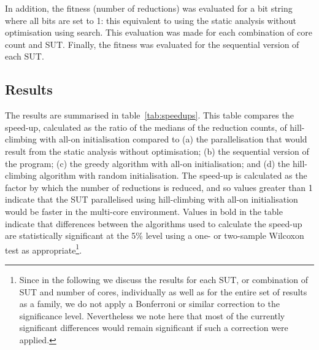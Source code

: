 In addition, the fitness (number of reductions) was evaluated for a bit string where all bits are set to 1: this equivalent to using the static analysis without optimisation using search.  This evaluation was made for each combination of core count and SUT.  Finally, the fitness was evaluated for the sequential version of each SUT.

\subsection{Results}

The results are summarised in table~\ref{tab:speedups}.  This table compares the speed-up, calculated as the ratio of the medians of the reduction counts, of hill-climbing with all-on initialisation compared to (a) the parallelisation that would result from the static analysis without optimisation; (b) the sequential version of the program; (c) the greedy algorithm with all-on initialisation; and (d) the hill-climbing algorithm with random initialisation.  The speed-up is calculated as the factor by which the number of reductions is reduced, and so values greater than 1 indicate that the SUT parallelised using hill-climbing with all-on initialisation would be faster in the multi-core environment.  Values in bold in the table indicate that differences between the algorithms used to calculate the speed-up are statistically significant at the 5\% level using a one- or two-sample Wilcoxon test as appropriate\footnote{Since in the following we discuss the results for each SUT, or combination of SUT and number of cores, individually as well as for the entire set of results as a family, we do not apply a Bonferroni or similar correction to the significance level.  Nevertheless we note here that most of the currently significant differences would remain significant if such a correction were applied.}.

